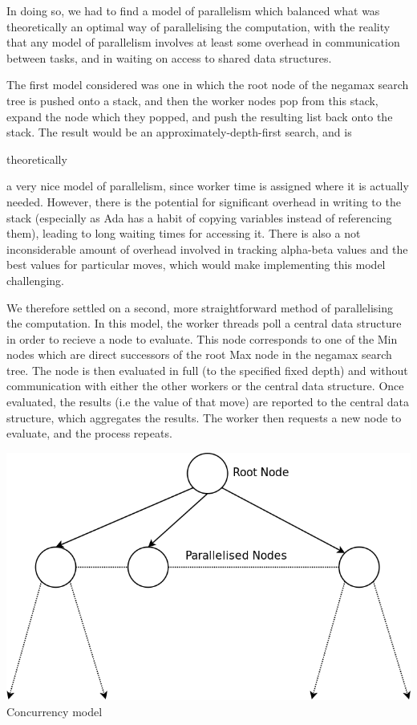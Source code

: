 \documentclass[10pt]{report}
\begin{document}
\begin{multicols}{2}
In doing so, we had to find a model of parallelism which balanced what was theoretically an optimal way of parallelising the computation, with the reality that any model of parallelism involves at least some overhead in communication between tasks, and in waiting on access to shared data structures.

The first model considered was one in which the root node of the negamax search tree is pushed onto a stack, and then the worker nodes pop from this stack, expand the node which they popped, and push the resulting list back onto the stack. The result would be an approximately-depth-first search, and is \begin{em} theoretically \end{em} a very nice model of parallelism, since worker time is assigned where it is actually needed. However, there is the potential for significant overhead in writing to the stack (especially as Ada has a habit of copying variables instead of referencing them), leading to long waiting times for accessing it. There is also a not inconsiderable amount of overhead involved in tracking alpha-beta values and the best values for particular moves, which would make implementing this model challenging.

We therefore settled on a second, more straightforward method of parallelising the computation. In this model, the worker threads poll a central data structure in order to recieve a node to evaluate. This node corresponds to one of the Min nodes which are direct successors of the root Max node in the negamax search tree. The node is then evaluated in full (to the specified fixed depth) and without communication with either the other workers or the central data structure. Once evaluated, the results (i.e the value of that move) are reported to the central data structure, which aggregates the results. The worker then requests a new node to evaluate, and the process repeats.

\begin{center}
\includegraphics[scale=0.31]{concurrency.png}
\\Concurrency model
\end{center}


\end{multicols}
\end{document}
